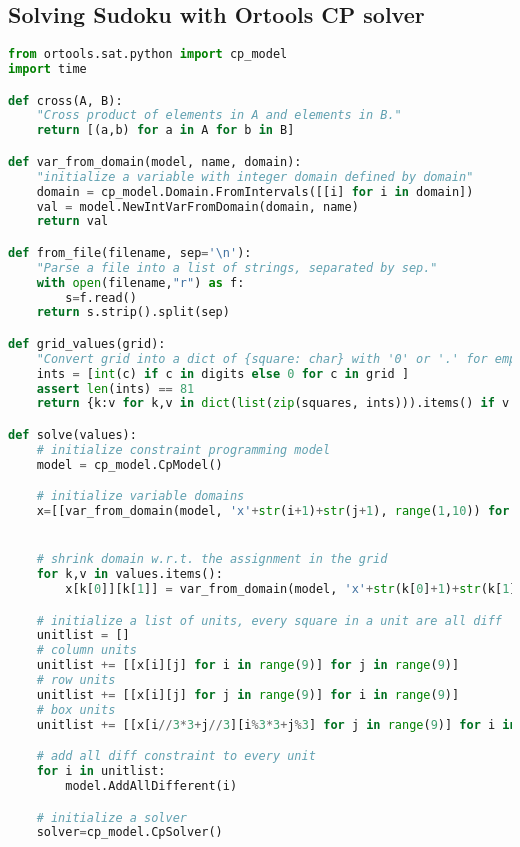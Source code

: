 \documentclass[a4paper, 12pt]{report}
\begin{document}
    \begin{appendices}
        \chapter{Solving Sudoku with Ortools CP solver}
            \label{solver}
            \begin{lstlisting}[frame=single,language=python]
from ortools.sat.python import cp_model
import time

def cross(A, B):
    "Cross product of elements in A and elements in B."
    return [(a,b) for a in A for b in B]

def var_from_domain(model, name, domain):
    "initialize a variable with integer domain defined by domain"
    domain = cp_model.Domain.FromIntervals([[i] for i in domain])
    val = model.NewIntVarFromDomain(domain, name)
    return val

def from_file(filename, sep='\n'):
    "Parse a file into a list of strings, separated by sep."
    with open(filename,"r") as f:
        s=f.read()
    return s.strip().split(sep)

def grid_values(grid):
    "Convert grid into a dict of {square: char} with '0' or '.' for empties."
    ints = [int(c) if c in digits else 0 for c in grid ]
    assert len(ints) == 81
    return {k:v for k,v in dict(list(zip(squares, ints))).items() if v!=0}

def solve(values):
    # initialize constraint programming model
    model = cp_model.CpModel()

    # initialize variable domains
    x=[[var_from_domain(model, 'x'+str(i+1)+str(j+1), range(1,10)) for j in range(9)] for i in range(9)]


    # shrink domain w.r.t. the assignment in the grid
    for k,v in values.items():
        x[k[0]][k[1]] = var_from_domain(model, 'x'+str(k[0]+1)+str(k[1]+1), [v])

    # initialize a list of units, every square in a unit are all diff
    unitlist = []
    # column units
    unitlist += [[x[i][j] for i in range(9)] for j in range(9)]
    # row units
    unitlist += [[x[i][j] for j in range(9)] for i in range(9)]
    # box units
    unitlist += [[x[i//3*3+j//3][i%3*3+j%3] for j in range(9)] for i in range(9)]

    # add all diff constraint to every unit
    for i in unitlist:
        model.AddAllDifferent(i)

    # initialize a solver
    solver=cp_model.CpSolver()


\end{lstlisting}
\end{appendices}
\end{document}
